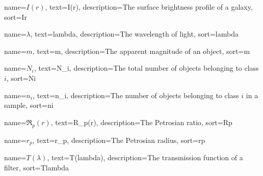 %
{%
	name={$I(r)$},
	text={I(r)},
	description={The surface brightness profile of a galaxy},
	sort={Ir}
}

%
{%
	name={$\lambda$},
	text={lambda},
	description={The wavelength of light},
	sort={lambda}
}

%
{%
	name={$m$},
	text={m},
	description={The apparent magnitude of an object},
	sort={m}
}

%
{%
	name={$N_i$},
	text={N_i},
	description={The total number of objects belonging to class $i$},
	sort={Ni}
}

%
{%
	name={$n_i$},
	text={n_i},
	description={The number of objects belonging to class $i$ in a sample},
	sort={ni}
}

%
{%
	name={$\mathfrak{R}_p(r)$},
	text={R_p(r)},
	description={The Petrosian ratio},
	sort={Rp}
}

%
{%
	name={$r_p$},
	text={r_p},
	description={The Petrosian radius},
	sort={rp}
}


%
{%
	name={$T(\lambda)$},
	text={T(lambda)},
	description={The transmission function of a filter},
	sort={Tlambda}
}




